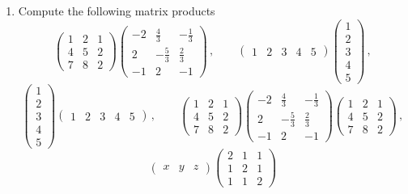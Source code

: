 


\begin{enumerate}

\item 
Compute the following matrix products
\[
\begin{pmatrix}1&2&1\\[1mm]4&5&2\\[1mm]7&8&2\end{pmatrix}
\begin{pmatrix}-2&\frac43&-\frac{1}{3}\\[1mm]2&-\frac53&\frac23\\[1mm]-1&2&-1\end{pmatrix}\, ,
\qquad
\begin{pmatrix}1&2&3&4&5\end{pmatrix}
\begin{pmatrix}1\\[1mm]2\\[1mm]3\\[1mm]4\\[1mm]5\end{pmatrix}\, ,
\]
\[
\begin{pmatrix}1\\[1mm]2\\[1mm]3\\[1mm]4\\[1mm]5\end{pmatrix}\begin{pmatrix}1&2&3&4&5\end{pmatrix}\, ,\qquad
\begin{pmatrix}1&2&1\\[1mm]4&5&2\\[1mm]7&8&2\end{pmatrix}
\begin{pmatrix}-2&\frac43&-\frac{1}{3}\\[1mm]2&-\frac53&\frac23\\[1mm]-1&2&-1\end{pmatrix}
\begin{pmatrix}1&2&1\\[1mm]4&5&2\\[1mm]7&8&2\end{pmatrix}\, ,
\]
\[
\begin{pmatrix}x & y &z\end{pmatrix}
\begin{pmatrix}
2& 1& 1 \\ 1 & 2 & 1 \\ 1 & 1 & 2
\end{pmatrix}
\]
\end{enumerate}
